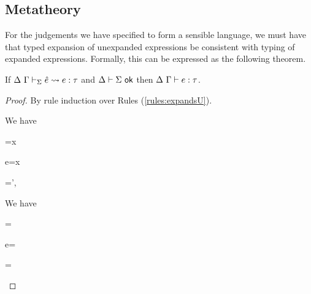 \subsection{Metatheory}
For the judgements we have specified to form a sensible language, we must have that typed expansion of unexpanded expressions be consistent with typing of expanded expressions. Formally, this can be expressed as the following theorem.

\begin{theorem}\label{thm:typed-expansion-U}
If $\Delta~\Gamma \vdash_{\Sigma} \hat{e} \leadsto e : \tau$ and $\Delta \vdash \Sigma~\mathsf{ok}$ then $\Delta~\Gamma \vdash e : \tau$. 
\end{theorem}
\begin{proof}
By rule induction over Rules (\ref{rules:expandsU}).
\begin{byCases}
\item[\text{(\ref{rule:expandsU-var})}] We have
\begin{pfsteps}
  \item \ue=x 
  \item e=x 
  \item \Gamma=\Gamma',  
  \item {} 
\end{pfsteps}
\resetpfcounter

\item[\text{(\ref{rule:expandsU-lam})}] We have 
\begin{pfsteps}
  \item \ue= 
  \item e= 
  \item \tau= 
  \item {}  
  \item {}  
  \item \uetsmenv{\Delta}{\Sigma}  
  \item {}  
  \item {} 
\end{pfsteps}
\resetpfcounter


\end{byCases}
\end{proof}
